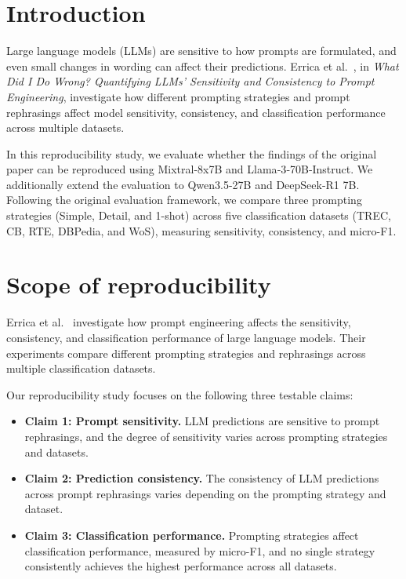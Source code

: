\section{Introduction}
\label{sec:introduction}

Large language models (LLMs) are sensitive to
how prompts are formulated, and even small
changes in wording can affect their predictions.
Errica et al.~\cite{Errica:2025}, in
\textit{What Did I Do Wrong? Quantifying LLMs'
Sensitivity and Consistency to Prompt Engineering},
investigate how different prompting strategies
and prompt rephrasings affect model sensitivity,
consistency, and classification performance
across multiple datasets.

\par\medskip

In this reproducibility study, we evaluate
whether the findings of the original paper
can be reproduced using Mixtral-8x7B and
Llama‐3‐70B‐Instruct. We additionally extend the
evaluation to Qwen3.5-27B and DeepSeek-R1 7B.
Following the original evaluation framework,
we compare three prompting strategies
(Simple, Detail, and 1-shot) across five
classification datasets (TREC, CB, RTE,
DBPedia, and WoS), measuring sensitivity,
consistency, and micro-F1.


\section{Scope of reproducibility}
\label{sec:claims}

Errica et al.~\cite{Errica:2025} investigate
how prompt engineering affects the sensitivity,
consistency, and classification performance
of large language models. Their experiments
compare different prompting strategies and
rephrasings across multiple classification
datasets.

Our reproducibility study focuses on the
following three testable claims:

\begin{itemize}
    \item \textbf{Claim 1: Prompt sensitivity.}
    LLM predictions are sensitive to prompt
    rephrasings, and the degree of sensitivity
    varies across prompting strategies
    and datasets.

    \item \textbf{Claim 2: Prediction consistency.}
    The consistency of LLM predictions across
    prompt rephrasings varies depending on
    the prompting strategy and dataset.

    \item \textbf{Claim 3: Classification performance.}
    Prompting strategies affect classification
    performance, measured by micro-F1, and
    no single strategy consistently achieves
    the highest performance across all datasets.
\end{itemize}

